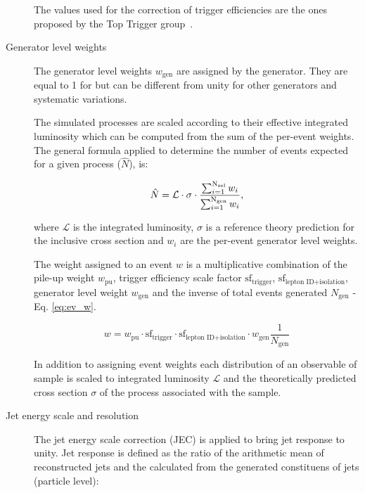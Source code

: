 \begin{description}
The values used for the correction of trigger efficiencies are the ones proposed by the Top Trigger group~\cite{twiki:toptrig}.

\item[Generator level weights]

The generator level weights $w_{\text{gen}}$ are assigned by the generator. They are equal to 1 for \POWHEG but can be different from unity for other generators and systematic variations.

The simulated processes are scaled according to their effective integrated luminosity which can be computed from the sum of the per-event weights. The general formula applied to determine the number of events expected for a given process ($\hat{N}$), is:

\begin{equation}
\hat{N}=\mathcal{L}\cdot\sigma\cdot\frac{\sum_{i=1}^{\rm N_{sel}} w_i}{\sum_{i=1}^{\rm N_{gen}} w_i},
\label{eq:genwgts}
\end{equation}

where $\mathcal{L}$ is the integrated luminosity, $\sigma$ is a reference theory prediction for the inclusive cross section and $w_i$ are the per-event generator level weights.

The weight assigned to an event $w$ is a multiplicative combination of the pile-up weight $w_{\text{pu}}$, trigger efficiency scale factor $\text{sf}_{\text{trigger}}$, $\text{sf}_{\text{lepton\ ID+isolation}}$, generator level weight $w_{\text{gen}}$ and the inverse of total events generated $N_{\text{gen}}$ - Eq. \ref{eq:ev_w}. 

\begin{equation}
w=w_{\text{pu}}\cdot\text{sf}_{\text{trigger}}\cdot\text{sf}_{\text{lepton\ ID+isolation}}\cdot w_{\text{gen}}\frac{1}{N_{\text{gen}}}
\label{eq:ev_w}
\end{equation}

In addition to assigning event weights each distribution of an observable of sample is scaled to integrated luminosity $\mathcal{L}$ and the theoretically predicted cross section $\sigma$ of the process associated with the sample. 


\item[Jet energy scale and resolution]
  The jet energy scale correction (JEC) is applied to bring jet response to unity. Jet response \JetResponse is defined as the ratio of the arithmetic mean of reconstructed jets \pt and the \pt calculated from the generated constituens of jets (particle level): 
  

\end{description}
